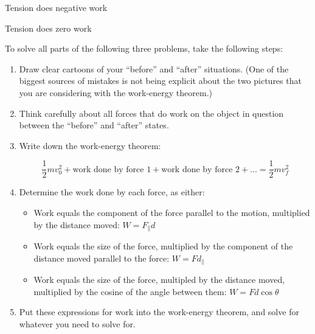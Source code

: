 \documentclass[12pt]{article}
\begin{document}
\vspace{1.2in}

\begin{minipage}{0.5\textwidth}	
		\begin{center}
	Tension does negative work
		\end{center}
\end{minipage}
\begin{minipage}{0.5\textwidth}	
		\begin{center}
	Tension does zero work
		\end{center}
\end{minipage}





\newpage

To solve all parts of the following three problems, take the following steps:

\begin{enumerate}
	\item Draw clear cartoons of your ``before'' and ``after'' situations. (One of the biggest sources of mistakes is not being explicit about the two pictures that you are considering with the work-energy theorem.)
	\item Think carefully about all forces that do work on the object in question between the ``before'' and ``after'' states.
	\item Write down the work-energy theorem:
	
	$$\frac{1}{2}mv_0^2 + \text{work done by force 1} + \text{work done by force 2} + ... = \frac{1}{2}mv_f^2$$
	
	\item Determine the work done by each force, as either:
	\begin{itemize}
		\item Work equals the component of the force parallel to the motion, multiplied by the distance moved: $W = F_\parallel d$
		\item Work equals the size of the force, multiplied by the component of the distance moved parallel to the force: $W = F d_\parallel$
		\item Work equals the size of the force, multipled by the distance moved, multiplied by the cosine of the angle between them: $W = F d \cos \theta$
	\end{itemize}
	
	\item Put these expressions for work into the work-energy theorem, and solve for whatever you need to solve for.
\end{enumerate}
\end{document}
